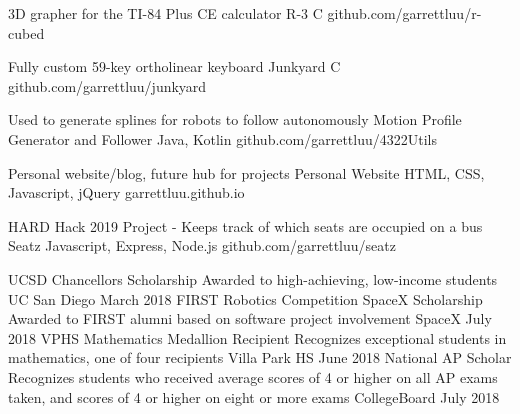 \documentclass[]{awesome-cv}
\begin{document}
\vspace{-7mm}
\begin{cventries}
	\cventry
	{3D grapher for the TI-84 Plus CE calculator}
	{R-3}
	{C}
	{github.com/garrettluu/r-cubed}
	{}
	
	\vspace{-5mm}
	\cventry
	{Fully custom 59-key ortholinear keyboard}
	{Junkyard}
	{C}
	{github.com/garrettluu/junkyard}
	{}
	
	\vspace{-5mm}
	\cventry
	{Used to generate splines for robots to follow autonomously}
	{Motion Profile Generator and Follower}
	{Java, Kotlin}
	{github.com/garrettluu/4322Utils}
	{}

	
	\vspace{-5mm}
	\cventry
	{Personal website/blog, future hub for projects}
	{Personal Website}
	{HTML, CSS, Javascript, jQuery}
	{garrettluu.github.io}
	{}

	\vspace{-5mm}
	\cventry
  {HARD Hack 2019 Project - Keeps track of which seats are occupied on a bus}
	{Seatz}
	{Javascript, Express, Node.js}
	{github.com/garrettluu/seatz}
  {}
	

\end{cventries}
\begin{cvhonors}
	\cvhonor
	{UCSD Chancellor\textquotesingle{}s Scholarship}
	{Awarded to high-achieving, low-income students}
	{UC San Diego}
	{March 2018}
	\cvhonor
	{FIRST Robotics Competition SpaceX Scholarship}
	{Awarded to FIRST alumni based on software project involvement}
	{SpaceX}
	{July 2018}
	\cvhonor
	{VPHS Mathematics Medallion Recipient}
	{Recognizes exceptional students in mathematics, one of four recipients}
	{Villa Park HS}
	{June 2018}
	\cvhonor
	{National AP Scholar}
	{Recognizes students who received average scores of 4 or higher on all AP exams taken, and scores of 4 or higher on eight or more exams}
	{CollegeBoard}
	{July 2018}
\end{cvhonors}
\end{document}
